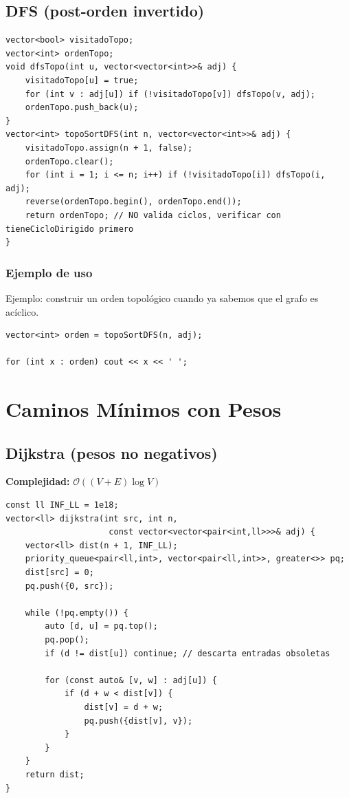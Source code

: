 \documentclass[10pt,twocolumn,letterpaper]{report}
\begin{document}
\subsection{DFS (post-orden invertido)}
\begin{lstlisting}
vector<bool> visitadoTopo;
vector<int> ordenTopo;
void dfsTopo(int u, vector<vector<int>>& adj) {
    visitadoTopo[u] = true;
    for (int v : adj[u]) if (!visitadoTopo[v]) dfsTopo(v, adj);
    ordenTopo.push_back(u);
}
vector<int> topoSortDFS(int n, vector<vector<int>>& adj) {
    visitadoTopo.assign(n + 1, false);
    ordenTopo.clear();
    for (int i = 1; i <= n; i++) if (!visitadoTopo[i]) dfsTopo(i, adj);
    reverse(ordenTopo.begin(), ordenTopo.end());
    return ordenTopo; // NO valida ciclos, verificar con tieneCicloDirigido primero
}
\end{lstlisting}
\subsubsection*{Ejemplo de uso}
Ejemplo: construir un orden topológico cuando ya sabemos que el grafo es acíclico.
\begin{lstlisting}
vector<int> orden = topoSortDFS(n, adj);

for (int x : orden) cout << x << ' ';
\end{lstlisting}


\section{Caminos Mínimos con Pesos}

\subsection{Dijkstra (pesos no negativos)}
\textbf{Complejidad:} $\mathcal{O}((V + E) \log V)$
\begin{lstlisting}
const ll INF_LL = 1e18;
vector<ll> dijkstra(int src, int n,
                     const vector<vector<pair<int,ll>>>& adj) {
    vector<ll> dist(n + 1, INF_LL);
    priority_queue<pair<ll,int>, vector<pair<ll,int>>, greater<>> pq;
    dist[src] = 0;
    pq.push({0, src});

    while (!pq.empty()) {
        auto [d, u] = pq.top();
        pq.pop();
        if (d != dist[u]) continue; // descarta entradas obsoletas

        for (const auto& [v, w] : adj[u]) {
            if (d + w < dist[v]) {
                dist[v] = d + w;
                pq.push({dist[v], v});
            }
        }
    }
    return dist;
}
\end{lstlisting}
\end{document}
